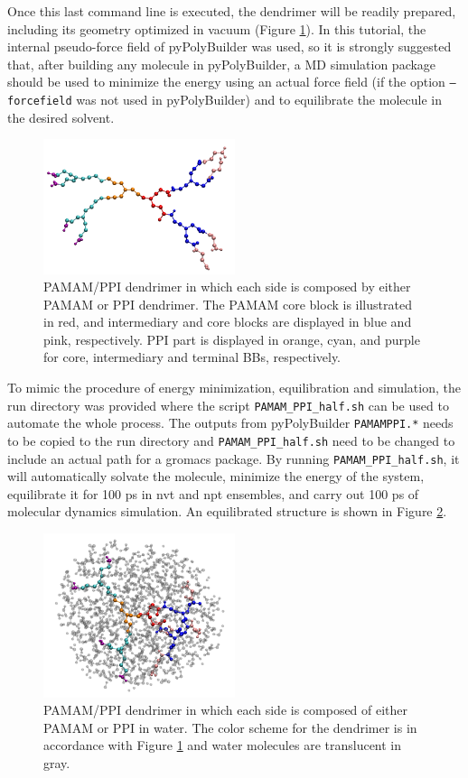 Once this last command line is executed, the dendrimer will be readily prepared, including its geometry optimized in vacuum (Figure \ref{fig:HalfPPB}).
In this tutorial, the internal pseudo-force field of pyPolyBuilder was used, so it is strongly suggested that, after building any molecule in pyPolyBuilder, a MD simulation package should be used to minimize the energy using an actual force field (if the option \texttt{--forcefield} was not used in pyPolyBuilder) and to equilibrate the molecule in the desired solvent.

\begin{figure}
    \centering
    \includegraphics[width=0.5\textwidth]{PAMAM_PPI-half/PAMAMPPIPPB.pdf}
    \caption{PAMAM/PPI dendrimer in which each side is composed by either PAMAM or PPI dendrimer. The PAMAM core block is illustrated in red, and intermediary and core blocks are displayed in blue and pink, respectively. PPI part is displayed in orange, cyan, and purple for core, intermediary and terminal BBs, respectively. }
    \label{fig:HalfPPB}
\end{figure}

To mimic the procedure of energy minimization, equilibration and simulation, the run directory was provided where the script \texttt{PAMAM\_PPI\_half.sh} can be used to automate the whole process.
The outputs from pyPolyBuilder \texttt{PAMAMPPI.*} needs to be copied to the run directory and \texttt{PAMAM\_PPI\_half.sh} need to be changed to include an actual path for a gromacs package.
By running \texttt{PAMAM\_PPI\_half.sh}, it will automatically solvate the molecule, minimize the energy of the system, equilibrate it for 100 ps in nvt and npt ensembles, and carry out 100 ps of molecular dynamics simulation.
An equilibrated structure is shown in Figure \ref{fig:HalfSOL}.

\begin{figure}
    \centering
    \includegraphics[width=0.5\textwidth]{PAMAM_PPI-half/PAMAMPPISOL.pdf}
    \caption{PAMAM/PPI dendrimer in which each side is composed of either PAMAM or PPI in water. The color scheme for the dendrimer is in accordance with Figure \ref{fig:HalfPPB} and water molecules are translucent in gray.}
    \label{fig:HalfSOL}
\end{figure}
